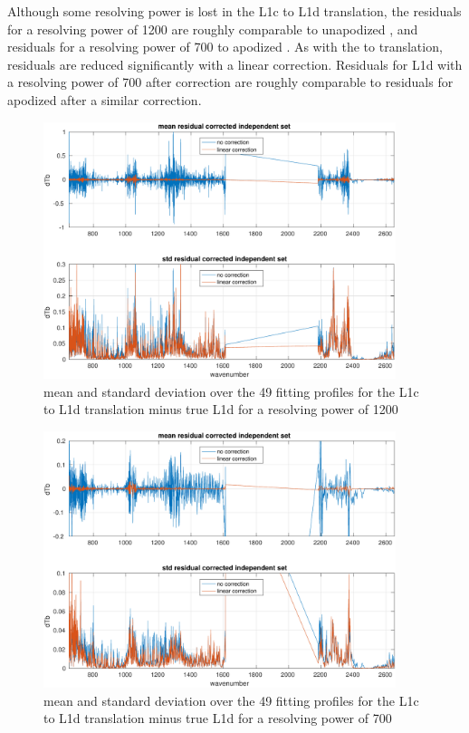 \documentclass[11pt]{article}
\begin{document}
Although some resolving power is lost in the L1c to L1d translation,
the residuals for a resolving power of 1200 are roughly comparable
to unapodized {\cris}, and residuals for a resolving power of 700 to
apodized {\cris}.  As with the {\airs} to {\cris} translation,
residuals are reduced significantly with a linear correction.
Residuals for L1d with a resolving power of 700 after correction are
roughly comparable to residuals for apodized {\cris} after a similar
correction.

\begin{figure} %
  \centering
  \includegraphics[height=7.5cm]{figures/L1d_corr_1200.pdf}
  \caption{mean and standard deviation over the 49 fitting profiles
    for the L1c to L1d translation minus true L1d for a resolving
    power of 1200}
  \label{L1d1200}
\end{figure}

\begin{figure} %
  \centering
  \includegraphics[height=7.5cm]{figures/L1d_corr_700.pdf}
  \caption{mean and standard deviation over the 49 fitting profiles
    for the L1c to L1d translation minus true L1d for a resolving
    power of 700}
  \label{L1d700s}
\end{figure}
\end{document}
